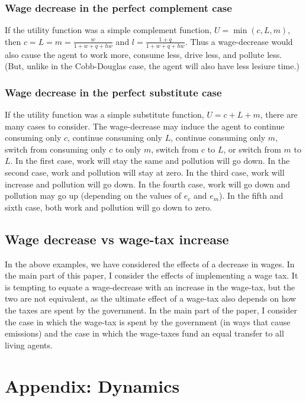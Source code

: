 \documentclass[letter, 12pt, epsf,leqno]{article}
\begin{document}
\subsubsection{Wage decrease in the perfect complement case}

If the utility function was a simple complement function, $U=\min(c, L, m)$, then $c=L=m=\frac{w}{1+w+q+hw}$ and $l=\frac{1+q}{1+w+q+hw}$.  Thus a wage-decrease would also cause the agent to work more, consume less, drive less, and pollute less.  (But, unlike in the Cobb-Douglas case, the agent will also have less lesiure time.)

\subsubsection{Wage decrease in the perfect substitute case}

If the utility function was a simple substitute function, $U=c+L+m$, there are many cases to consider.  The wage-decrease may induce the agent to continue consuming only $c$, continue consuming only $L$,  continue consuming only $m$, switch from consuming only $c$ to only $m$, switch from $c$ to $L$, or switch from $m$ to $L$.  In the first case, work will stay the same and pollution will go down.  In the second case, work and pollution will stay at zero.  In the third case, work will increase and pollution will go down.  In the fourth case, work will go down and pollution may go up (depending on the values of $e_c$ and $e_m$).  In the fifth and sixth case, both work and pollution will go down to zero.


\subsection{Wage decrease vs wage-tax increase}
In the above examples, we have considered the effects of a decrease in wages.  In the main part of this paper, I consider the effects of implementing a wage tax.  It is tempting to equate a wage-decrease with an increase in the wage-tax, but the two are not equivalent, as the ultimate effect of a wage-tax also depends on how the taxes are spent by the government.  In the main part of the paper, I consider the case in which the wage-tax is spent by the government (in ways that cause emissions) and the case in which the wage-taxes fund an equal transfer to all living agents.

\section{Appendix: Dynamics}
\end{document}

